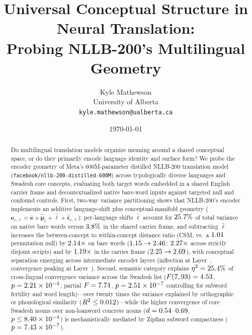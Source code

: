 \title{Universal Conceptual Structure in Neural Translation:\\
Probing NLLB-200's Multilingual Geometry}

\author{
  Kyle Mathewson \\
  University of Alberta \\
  \texttt{kyle.mathewson@ualberta.ca}
}

\date{\today}

\maketitle

\begin{abstract}
Do multilingual translation models organize meaning around a shared conceptual space, or do they primarily encode language identity and surface form?
We probe the encoder geometry of Meta's 600M-parameter distilled NLLB-200 translation model (\texttt{facebook/\allowbreak nllb-200-\allowbreak distilled-600M}) across \NumLanguages{} typologically diverse languages and \NumConcepts{} Swadesh core concepts, evaluating both target words embedded in a shared English carrier frame and decontextualized native bare-word inputs against targeted null and confound controls.
First, two-way variance partitioning shows that NLLB-200's encoder implements an additive language-shift plus conceptual-manifold geometry ($\mathbf{e}_{c,\ell} = \bar{\mathbf{e}} + \hat{\boldsymbol{\mu}}_c + \hat{\boldsymbol{\ell}} + \hat{\boldsymbol{\epsilon}}_{c,\ell}$): per-language shifts $\hat{\boldsymbol{\ell}}$ account for $25.7\%$ of total variance on native bare words versus $3.8\%$ in the shared carrier frame, and subtracting $\hat{\boldsymbol{\ell}}$ increases the between-concept to within-concept distance ratio (CSM, vs.\ a $1.01$ permutation null) by $2.14\times$ on bare words ($1.15 \to 2.46$; $2.27\times$ across strictly disjoint scripts) and by $1.19\times$ in the carrier frame ($2.25 \to 2.69$), with conceptual separation emerging across intermediate encoder layers (inflection at Layer~\LayerwisePhaseTrans{}, convergence peaking at Layer~\LayerwisePeakLayer{}).
Second, semantic category explains $\eta^2 = 25.4\%$ of cross-lingual convergence variance across the Swadesh list ($F(7,93) = 4.53$, $p = 2.21 \times 10^{-4}$; partial $F = 7.74$, $p = 2.51 \times 10^{-7}$ controlling for subword fertility and word length)—over twenty times the variance explained by orthographic or phonological similarity ($R^2 \le 0.012$)—while the higher convergence of core Swadesh nouns over non-loanword concrete nouns ($d = 0.54$--$0.69$, $p \le 8.40 \times 10^{-4}$) is mechanistically mediated by Zipfian subword compactness ($p = 7.43 \times 10^{-7}$).

\end{abstract}
